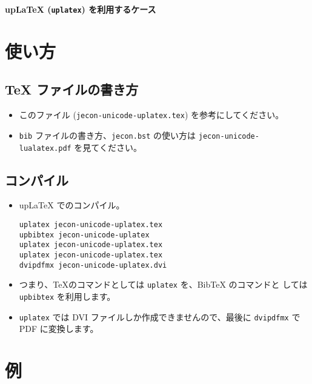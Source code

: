 \documentclass[uplatex,dvipdfmx]{jsarticle}
\begin{document}

\begin{flushleft}
 {\Large \textbf{upLaTeX (\texttt{uplatex}) を利用するケース}}
\end{flushleft}

\vspace{1em}


\section{使い方}

\subsection{TeX ファイルの書き方}

\begin{itemize}
 \item このファイル (\texttt{jecon-unicode-uplatex.tex}) を参考にしてください。
 \item \texttt{bib} ファイルの書き方、\texttt{jecon.bst} の使い方は
       \texttt{jecon-unicode-lualatex.pdf} を見てください。
\end{itemize}

\subsection{コンパイル}

\begin{itemize}
 \item upLaTeX でのコンパイル。
\begin{verbatim}
uplatex jecon-unicode-uplatex.tex
upbibtex jecon-unicode-uplatex
uplatex jecon-unicode-uplatex.tex               
uplatex jecon-unicode-uplatex.tex
dvipdfmx jecon-unicode-uplatex.dvi
\end{verbatim}
 \item つまり、\TeX のコマンドとしては \texttt{uplatex} を、BibTeX のコマンドと
       しては \texttt{upbibtex} を利用します。
 \item \texttt{uplatex} では DVI ファイルしか作成できませんので、最後に
       \texttt{dvipdfmx} で PDF に変換します。
\end{itemize}

\section{例}



\nocite{*}



%

\end{document}
